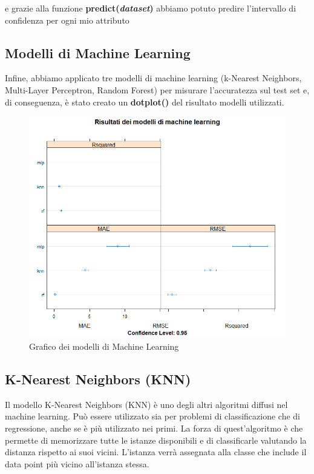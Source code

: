 \documentclass{article}
\begin{document}
 e grazie alla funzione \textbf{predict(\textit{dataset})} abbiamo potuto predire l’intervallo di confidenza per ogni mio attributo

\subsection{ Modelli di Machine Learning }
Infine, abbiamo applicato tre modelli di machine learning (k-Nearest Neighbors, Multi-Layer Perceptron, Random Forest) per misurare l’accuratezza sul test set e, di conseguenza, è stato creato un \textbf{dotplot()} del risultato modelli utilizzati.

\begin{figure}[h]
	\centering
	\includegraphics[width=1\textwidth]{modelli ml}
	\caption{Grafico dei modelli di Machine Learning}
	\label {fig:ds1}
\end{figure}

\subsection {K-Nearest Neighbors (KNN) } 
Il modello K-Nearest Neighbors (KNN) è uno degli altri algoritmi diffusi nel machine learning. Può essere utilizzato sia per problemi di classificazione che di regressione, anche se è più utilizzato nei primi. La forza di quest’algoritmo è che permette di memorizzare tutte le istanze disponibili e di classificarle valutando la distanza rispetto ai suoi vicini. L’istanza verrà assegnata alla classe che include il data point più vicino all’istanza stessa. 
\end{document}
